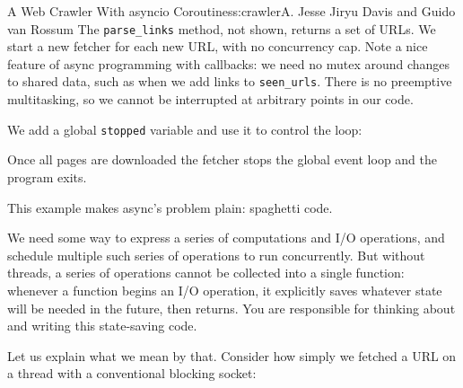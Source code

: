 \begin{aosachapter}{A Web Crawler With asyncio Coroutines}{s:crawler}{A. Jesse Jiryu Davis and Guido van Rossum}
The \texttt{parse\_links} method, not shown, returns a set of URLs. We
start a new fetcher for each new URL, with no concurrency cap. Note a
nice feature of async programming with callbacks: we need no mutex
around changes to shared data, such as when we add links to
\texttt{seen\_urls}. There is no preemptive multitasking, so we cannot
be interrupted at arbitrary points in our code.

We add a global \texttt{stopped} variable and use it to control the
loop:

\begin{Shaded}
\begin{Highlighting}[]

 
     
         
\end{Highlighting}
\end{Shaded}

Once all pages are downloaded the fetcher stops the global event loop
and the program exits.

This example makes async's problem plain: spaghetti code.

We need some way to express a series of computations and I/O operations,
and schedule multiple such series of operations to run concurrently. But
without threads, a series of operations cannot be collected into a
single function: whenever a function begins an I/O operation, it
explicitly saves whatever state will be needed in the future, then
returns. You are responsible for thinking about and writing this
state-saving code.

Let us explain what we mean by that. Consider how simply we fetched a
URL on a thread with a conventional blocking socket:

\begin{Shaded}
\begin{Highlighting}[]
 
    \NormalTok{((}\NormalTok{, }\NormalTok{))}
    \NormalTok{))}
    \NormalTok{)}
     
        \NormalTok{)}
    

\end{Highlighting}
\end{Shaded}
\end{aosachapter}

